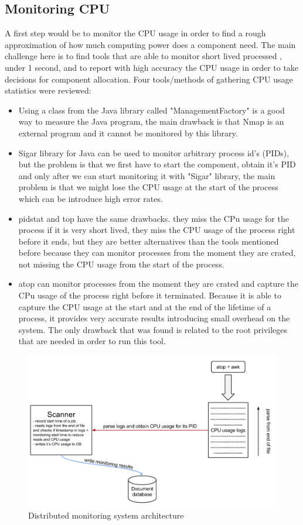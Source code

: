 \subsection{Monitoring CPU}
A first step would be to monitor the CPU usage in order to find a rough approximation of how much computing power does a component need. The main challenge here is to find tools that are able to monitor short lived processed , under 1 second, and to report with high accuracy the CPU usage in order to take decisions for component allocation. Four tools/methods of gathering CPU usage statistics were reviewed:  
\begin{itemize}
	\item Using a class from the Java library called "ManagementFactory" is a good way to measure the Java program, the main drawback is that Nmap is an external program and it cannot be monitored by this library.
	\item Sigar library for Java can be used to monitor arbitrary process id's (PIDs), but the problem is that we first have to start the component, obtain it's PID and only after we can start monitoring it with "Sigar" library, the main problem is that we might lose the CPU usage at the start of the process which can be introduce high error rates.
	\item pidstat and top have the same drawbacks. they miss the CPu usage for the process if it is very short lived, they miss the CPU usage of the process right before it ends, but they are better alternatives than the tools mentioned before because they can monitor processes from the moment they are crated, not missing the CPU usage from the start of the process.
	\item atop can monitor processes from the moment they are crated and capture the CPu usage of the process right before it terminated. Because it is able to capture the CPU usage at the start and at the end of the lifetime of a process, it provides very accurate results introducing small overhead on the system. The only drawback that was found is related to the root privileges that are needed in order to run this tool.
\end{itemize}
 
\begin{figure}[t]
\centering
\includegraphics[width=\linewidth]{./img/MonitoringCPUMechanism.png}
\caption{Distributed monitoring system architecture}
\label{fig:monitoringArchitecture}
\end{figure} 
 
